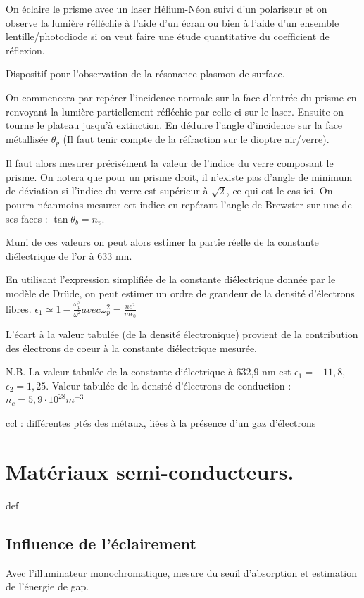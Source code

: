 \documentclass{article}%
\begin{document}
On éclaire le prisme avec un laser Hélium-Néon suivi d'un polariseur et on observe la lumière réfléchie à l'aide d'un écran ou bien à l'aide d'un ensemble lentille/photodiode si on veut faire une étude quantitative du coefficient de réflexion.


Dispositif pour l'observation de la résonance plasmon de surface.


On commencera par repérer l'incidence normale sur la face d'entrée du prisme en renvoyant la lumière partiellement réfléchie par celle-ci sur le laser. Ensuite on tourne le plateau jusqu'à extinction. En déduire l'angle d'incidence sur la face métallisée $\theta_p$ (Il faut tenir compte de la réfraction sur le dioptre air/verre).

Il faut alors mesurer précisément la valeur de l'indice du verre composant le prisme. On notera que pour un prisme droit, il n'existe pas d'angle de minimum de déviation si l'indice du verre est supérieur à $\sqrt{2}$, ce qui est le cas ici. On pourra néanmoins mesurer cet indice en repérant l'angle de Brewster sur une de ses faces : $\tan \theta_b=n_v$.

Muni de ces valeurs on peut alors estimer la partie réelle de la constante diélectrique de l'or à 633 nm.

En utilisant l'expression simplifiée de la constante diélectrique donnée par le modèle de Drüde, on peut estimer un ordre de grandeur de la densité d'électrons libres.
$\epsilon_1 \simeq 1- \frac{\omega_p^2}{\omega^2} avec \omega_p^2=\frac{ne^2}{m \epsilon_0}$

L'écart à la valeur tabulée (de la densité électronique) provient de la contribution des électrons de coeur à la constante diélectrique mesurée.

N.B. La valeur tabulée de la constante diélectrique à 632,9 nm est $\epsilon_1=-11,8$, $\epsilon_2=1,25$. Valeur tabulée de la densité d'électrons de conduction : $n_c=5,9\cdot10^{28} m^{-3}$



ccl : différentes ptés des métaux, liées à la présence d'un gaz d'électrons

\section{Matériaux semi-conducteurs.}

def

\subsection{Influence de l'éclairement}
Avec l'illuminateur monochromatique, mesure du seuil d'absorption et estimation de l'énergie de gap.
\end{document}
